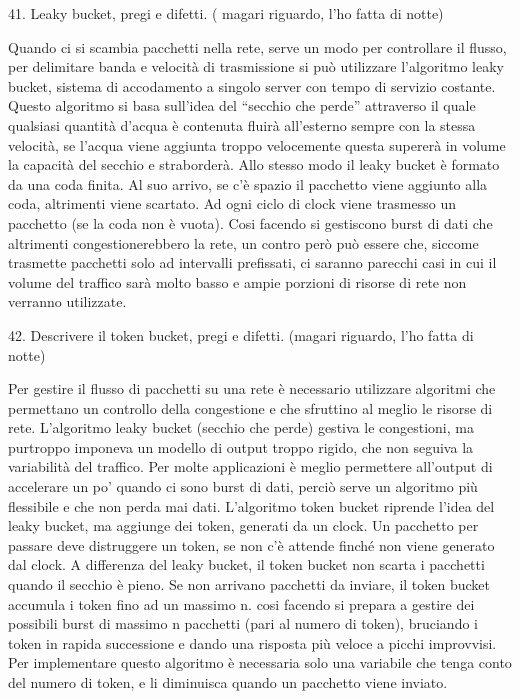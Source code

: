 41.	Leaky bucket, pregi e difetti. ( magari riguardo, l’ho fatta di notte)


Quando ci si scambia pacchetti nella rete, serve un modo per controllare il flusso, per delimitare banda e velocità di trasmissione si può utilizzare l’algoritmo leaky bucket, sistema di accodamento a singolo server con tempo di servizio costante.
Questo algoritmo si basa sull’idea del “secchio che perde” attraverso il quale qualsiasi quantità d’acqua è contenuta fluirà all’esterno sempre con la stessa velocità, se l’acqua viene aggiunta troppo velocemente questa supererà in volume la capacità del secchio e straborderà.
Allo stesso modo il leaky bucket è formato da una coda finita. Al suo arrivo, se c’è spazio il pacchetto viene aggiunto alla coda, altrimenti viene scartato. Ad ogni ciclo di clock viene trasmesso un pacchetto (se la coda non è vuota).
Cosi facendo si gestiscono burst di dati che altrimenti congestionerebbero la rete, un contro però può essere che, siccome trasmette pacchetti solo ad intervalli prefissati, ci saranno parecchi casi in cui il volume del traffico sarà molto basso e ampie porzioni di risorse di rete non verranno utilizzate.



 

42.	Descrivere il token bucket, pregi e difetti. (magari riguardo, l’ho fatta di notte)

Per gestire il flusso di pacchetti su una rete è necessario utilizzare algoritmi che permettano un controllo della congestione e che sfruttino al meglio le risorse di rete. L’algoritmo leaky bucket (secchio che perde) gestiva le congestioni, ma purtroppo imponeva un modello di output troppo rigido, che non seguiva la variabilità del traffico.
Per molte applicazioni è meglio permettere all’output di accelerare un po’ quando ci sono burst di dati, perciò serve un algoritmo più flessibile e che non perda mai dati.
L’algoritmo token bucket riprende l’idea del leaky bucket, ma aggiunge dei token, generati da un clock.
Un pacchetto per passare deve distruggere un token, se non c’è attende finché non viene generato dal clock. A differenza del leaky bucket, il token bucket non scarta i pacchetti quando il secchio è pieno.
Se non arrivano pacchetti da inviare, il token bucket accumula i token fino ad un massimo n. cosi facendo si prepara a gestire dei possibili burst di massimo n pacchetti (pari al numero di token), bruciando i token in rapida successione e dando una risposta più veloce a picchi improvvisi.
Per implementare questo algoritmo è necessaria solo una variabile che tenga conto del numero di token, e li diminuisca quando un pacchetto viene inviato.
 

